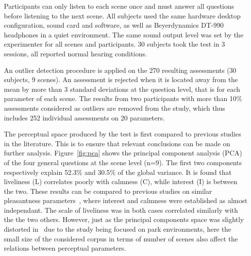 \documentclass{article}
\begin{document}
\begin{sloppy}
Participants can only listen to each scene once and must answer all questions before listening to the next scene. All subjects used the same hardware desktop configuration, sound card and software, as well as Beyerdynamics DT-990 headphones in a quiet environment. The same sound output level was set by the experimenter for all scenes and participants. 30 subjects took the test in 3 sessions, all reported normal hearing conditions.

An outlier detection procedure is applied on the 270 resulting assessments (30 subjects, 9 scenes). An assessment is rejected when it is located away from the mean by more than 3 standard deviations at the question level, that is for each parameter of each scene. The results from two participants with more than 10\% assessments considered as outliers are removed from the study, which thus includes 252 individual assessments on 20 parameters.

The perceptual space produced by the test is first compared to previous studies in the literature. This is to ensure that relevant conclusions can be made on further analysis. Figure~\ref{fig:pca} shows the principal component analysis (PCA) of the four general questions at the scene level (n=9). The first two components respectively explain 52.3\% and 30.5\% of the global variance. It is found that liveliness (L) correlates poorly with calmness (C), while interest (I) is between the two. These results can be compared to previous studies on similar pleasantness parameters~\cite{axelsson2010, cain2013, jeon2018}, where interest and calmness were established as almost independant. The scale of liveliness was in both cases correlated similarly with the the two others. However, just as the principal components space was slightly distorted in~\cite{jeon2018} due to the study being focused on park environments, here the small size of the considered corpus in terms of number of scenes also affect the relations between perceptual parameters.


\end{sloppy}
\end{document}
